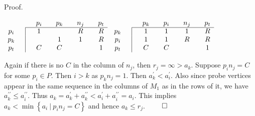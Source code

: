 \documentclass[secthm]{elsart}
\newcommand{\set}[1]{\left\{#1\right\}}
\newcommand{\Set}[2]{\set{#1\ \vert\ #2}}
\begin{document}
\begin{pf*}{Proof.}
\begin{center}
$\begin{array}{cc|cccccccc}
\multicolumn{3}{c}{} & p_i && p_k && n_j && p_t\\ \cline{3-10}
p_i &&& 1 &&  && R && R\\
p_k &&&  && 1 && 1 && R\\
p_t &&& C && C && && 1\\
\end{array}$ \hspace{1in}
$\begin{array}{cc|cccccccc}
\multicolumn{3}{c}{} & p_k && p_i && n_j && p_t\\ \cline{3-10}
p_k &&& 1 && 1 && 1 && R\\
p_i &&& 1 && 1 && R && R\\
p_t &&& C && C && && 1\\
\end{array}$
\end{center}

Again if there is no $C$ in the column of $n_j$, then $r_j=\infty >a_k$. Suppose $p_in_j=C$ for some $p_i\in P$. Then $i>k$ as $p_kn_j=1$.  Then $a_k^\prime < a_i^\prime$. Also since probe vertices appear in the same sequence in the columns of $M_1$ as in the rows of it, we have $a_k^{\prime\prime} \leqslant a_i^{\prime\prime}$. Thus $a_k=a_k^\prime +a_k^{\prime\prime} < a_i^\prime +a_i^{\prime\prime}=a_i$. This implies $a_k<\min\Set{a_i}{p_in_j=C}$ and hence $a_k\leqslant r_j$. \hfill $\qed$
\end{pf*}
\end{document}
